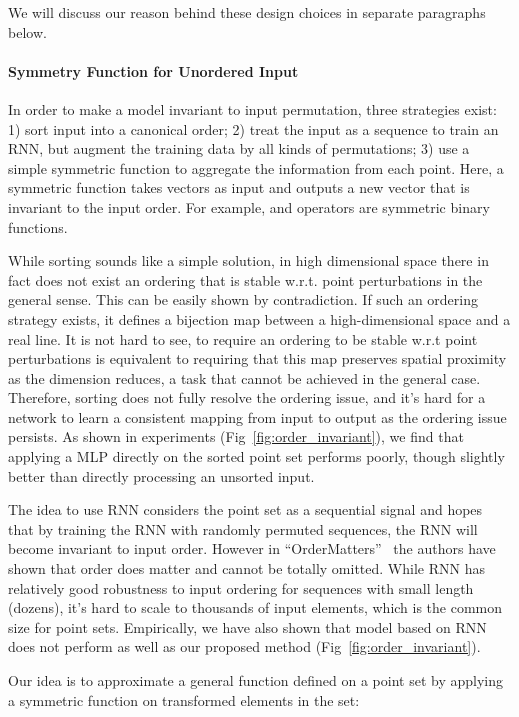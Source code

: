 \documentclass[10pt,twocolumn,letterpaper]{article}
\begin{document}
We will discuss our reason behind these design choices in separate paragraphs below. 



\paragraph{Symmetry Function for Unordered Input}
In order to make a model invariant to input permutation, three strategies exist: 1) sort input into a canonical order; 2) treat the input as a sequence to train an RNN, but augment the training data by all kinds of permutations; 3) use a simple symmetric function to aggregate the information from each point. Here, a symmetric function takes  vectors as input and outputs a new vector that is invariant to the input order. For example,  and  operators are symmetric binary functions. 

While sorting sounds like a simple solution, in high dimensional space there in fact does not exist an ordering that is stable w.r.t. point perturbations in the general sense. This can be easily shown by contradiction. If such an ordering strategy exists, it defines a bijection map between a high-dimensional space and a  real line. It is not hard to see, to require an ordering to be stable w.r.t point perturbations is equivalent to requiring that this map preserves spatial proximity as the dimension reduces, a task that cannot be achieved in the general case. Therefore, sorting does not fully resolve the ordering issue, and it's hard for a network to learn a consistent mapping from input to output as the ordering issue persists. As shown in experiments (Fig~\ref{fig:order_invariant}), we find that applying a MLP directly on the sorted point set performs poorly, though slightly better than directly processing an unsorted input.

The idea to use RNN considers the point set as a sequential signal and hopes that by training the RNN with randomly permuted sequences, the RNN will become invariant to input order. However in ``OrderMatters''~\cite{vinyals2015order} the authors have shown that order does matter and cannot be totally omitted. While RNN has relatively good robustness to input ordering for sequences with small length (dozens), it's hard to scale to thousands of input elements, which is the common size for point sets. Empirically, we have also shown that model based on RNN does not perform as well as our proposed method (Fig~\ref{fig:order_invariant}).

Our idea is to approximate a general function defined on a point set by applying a symmetric function on transformed elements in the set: 
\end{document}
